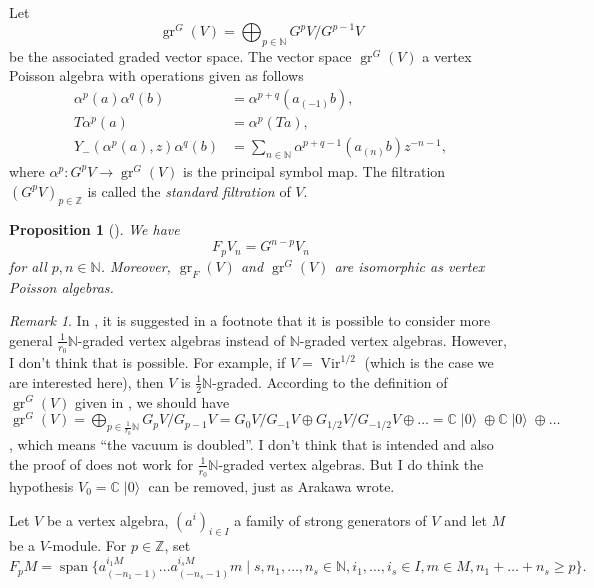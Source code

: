 \documentclass[a4paper, 12pt, reqno]{amsart}
\newtheorem{proposition}[theorem]{Proposition}
\theoremstyle{remark}
\newtheorem{remark}[theorem]{Remark}
\DeclareMathOperator{\Vir}{Vir}
\DeclareMathOperator{\gr}{gr}
\DeclareMathOperator{\vspan}{span}
\DeclareMathOperator{\vac}{|0\rangle}
\begin{document}
Let
\begin{equation*}
  \gr^G(V) = \bigoplus_{p \in \mathbb{N}}G^pV/G^{p - 1}V
\end{equation*}
be the associated graded vector space.
The vector space $\gr^G(V)$ a vertex Poisson algebra with operations given as follows
\begin{align*}
  \alpha^p(a)\alpha^q(b) &= \alpha^{p + q}(a_{(-1)}b), \\
  T\alpha^p(a) &= \alpha^p(Ta), \\
  Y_-(\alpha^p(a), z)\alpha^q(b) &= \sum_{n \in \mathbb{N}}\alpha^{p + q - 1}(a_{(n)}b)z^{-n - 1},
\end{align*}
where $\alpha^p: G^pV \to \gr^G(V)$ is the principal symbol map.
The filtration $(G^pV)_{p \in \mathbb{Z}}$ is called the \emph{standard filtration} of $V$.

\begin{proposition}[{\cite[Proposition 2.6.1]{arakawa_remark_2012}}]
  \label{prp:3}
  We have
  \begin{equation*}
    F_pV_n = G^{n - p}V_n
  \end{equation*}
  for all $p, n \in \mathbb{N}$.
  Moreover, $\gr_F(V)$ and $\gr^G(V)$ are isomorphic as vertex Poisson algebras.
\end{proposition}

\begin{remark}
  \label{rmk:1}
  In \cite{arakawa_remark_2012}, it is suggested in a footnote that it is possible to consider more general $\tfrac{1}{r_0}\mathbb{N}$-graded vertex algebras instead of $\mathbb{N}$-graded vertex algebras.
  However, I don't think that is possible.
  For example, if $V = \Vir^{1/2}$ (which is the case we are interested here), then $V$ is $\tfrac{1}{2}\mathbb{N}$-graded.
  According to the definition of $\gr^G(V)$ given in \cite{arakawa_remark_2012}, we should have $\gr^G(V) = \bigoplus_{p \in \tfrac{1}{r_0}\mathbb{N}}G_pV/G_{p - 1}V = G_0V/G_{-1}V \oplus G_{1/2}V/G_{-1/2}V \oplus \dots = \mathbb{C}\vac \oplus \mathbb{C}\vac \oplus \dots$, which means ``the vacuum is doubled''.
  I don't think that is intended and also the proof of \cite[Proposition 2.6.1]{arakawa_remark_2012} does not work for $\tfrac{1}{r_0}\mathbb{N}$-graded vertex algebras.
  But I do think the hypothesis $V_0 = \mathbb{C}\vac$ can be removed, just as Arakawa wrote.
\end{remark}

Let $V$ be a vertex algebra, $(a^i)_{i \in I}$ a family of strong generators of $V$ and let $M$ be a $V$-module.
For $p \in \mathbb{Z}$, set
\begin{equation*}
  F_pM = \vspan \{a^{i_1M}_{(-n_1 - 1)}\dots a^{i_sM}_{(-n_s - 1)}m \mid s, n_1, \dots, n_s \in \mathbb{N}, i_1, \dots, i_s \in I, m \in M, n_1 + \dots + n_s \ge p\}.
\end{equation*}
\end{document}
